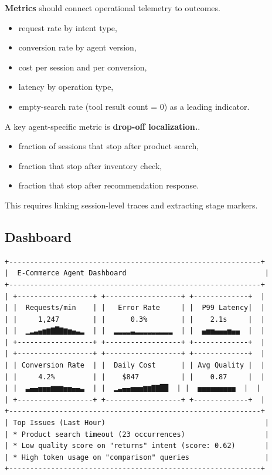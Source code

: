 \textbf{Metrics} should connect operational telemetry to outcomes.
\begin{itemize}
\item request rate by intent type,
\item conversion rate by agent version,
\item cost per session and per conversion,
\item latency by operation type,
\item empty-search rate (tool result count = 0) as a leading indicator.
\end{itemize}

A key agent-specific metric is \textbf{drop-off localization.}.
\begin{itemize}
\item fraction of sessions that stop after product search,
\item fraction that stop after inventory check,
\item fraction that stop after recommendation response.
\end{itemize}
This requires linking session-level traces and extracting stage markers.

\subsection{Dashboard}

{\scriptsize
\begin{verbatim}
+------------------------------------------------------------+
|  E-Commerce Agent Dashboard                                 |
+------------------------------------------------------------+
| +------------------+ +------------------+ +-------------+  |
| |  Requests/min    | |   Error Rate     | |  P99 Latency|  |
| |     1,247        | |      0.3%        | |    2.1s     |  |
| |  ▁▂▃▄▅▆▇█▇▆▅▄▃▂  | |  ▂▂▂▂▃▂▂▂▂▂▂▂▂▂  | |  ▄▅▅▄▄▄▅▄▄  |  |
| +------------------+ +------------------+ +-------------+  |
| +------------------+ +------------------+ +-------------+  |
| | Conversion Rate  | |  Daily Cost      | | Avg Quality |  |
| |     4.2%         | |    $847          | |    0.87     |  |
| |  ▃▄▄▅▅▅▆▆▆▅▅▄▄▃  | |  ▂▃▄▄▅▅▅▆▆▇▇██  | |  ▅▅▅▅▅▅▅▅▅  |  |
| +------------------+ +------------------+ +-------------+  |
+------------------------------------------------------------+
| Top Issues (Last Hour)                                      |
| * Product search timeout (23 occurrences)                   |
| * Low quality score on "returns" intent (score: 0.62)       |
| * High token usage on "comparison" queries                  |
+------------------------------------------------------------+
\end{verbatim}
}

